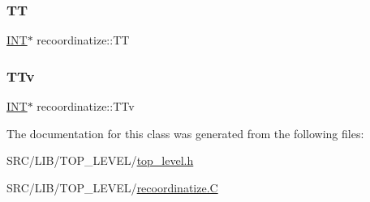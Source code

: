 \mbox{\label{classrecoordinatize_a753a299deacf9bfab4a5f2b63223f53f}} 
\subsubsection{\texorpdfstring{TT}{TT}}
{\footnotesize\ttfamily \mbox{\hyperlink{galois_8h_a09fddde158a3a20bd2dcadb609de11dc}{I\+NT}}$\ast$ recoordinatize\+::\+TT}

\mbox{\label{classrecoordinatize_ad4d777c81681afe914bed0daa1ba5370}} 
\subsubsection{\texorpdfstring{T\+Tv}{TTv}}
{\footnotesize\ttfamily \mbox{\hyperlink{galois_8h_a09fddde158a3a20bd2dcadb609de11dc}{I\+NT}}$\ast$ recoordinatize\+::\+T\+Tv}



The documentation for this class was generated from the following files\+:\begin{DoxyCompactItemize}
\item 
S\+R\+C/\+L\+I\+B/\+T\+O\+P\+\_\+\+L\+E\+V\+E\+L/\mbox{\hyperlink{top__level_8h}{top\+\_\+level.\+h}}\item 
S\+R\+C/\+L\+I\+B/\+T\+O\+P\+\_\+\+L\+E\+V\+E\+L/\mbox{\hyperlink{recoordinatize_8_c}{recoordinatize.\+C}}\end{DoxyCompactItemize}
